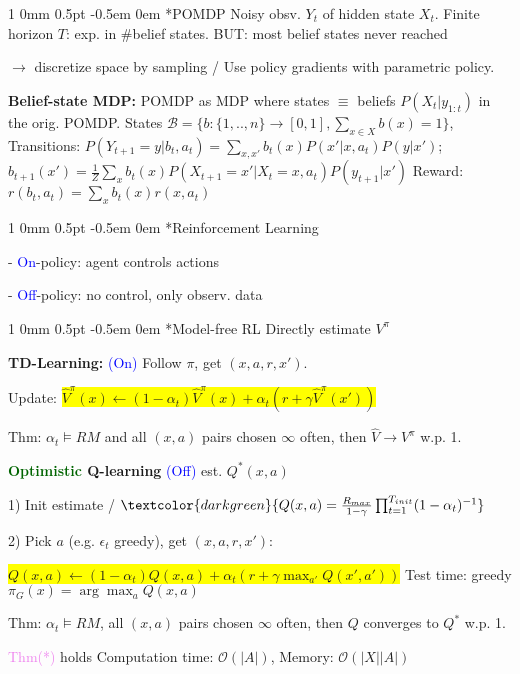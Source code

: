 \documentclass[11pt,landscape,a4paper,fleqn]{article}
\makeatletter
\newcommand*{\rsection}{%
	\@startsection{section}%
	{1}%
	{0mm}%
	{0.5pt}%
	{-0.5em \@plus 0em}
	{\color{myorange}\sffamily\small\bfseries}}
\newcommand{\mhl}[1]{\setlength{\fboxsep}{0pt}\colorbox{yellow}{#1}}
\makeatother
\begin{document}
\begin{multicols*}{4}
		\rsection*{POMDP} Noisy obsv. $Y_t$ of hidden state $X_t$. Finite horizon $T$:
		exp. in \#belief states.
		BUT: most belief states never reached

	$\rightarrow$ discretize space by sampling /
		Use policy gradients with parametric policy.

		\textbf{Belief-state MDP:} POMDP as MDP where states $\equiv$ beliefs $P(X_t | y_{1:t})$ in the orig. POMDP.
		States $\mathcal{B} = \{b : \{1,..,n\} \rightarrow [0,1], \sum_{x \in X} b(x) = 1\}$,
		Transitions: $P(Y_{t+1} = y | b_t, a_t) = \sum_{x,x'} b_t(x) P(x' | x, a_t) P(y | x')$;
	$b_{t+1}(x') = \frac{1}{Z} \sum_x b_t(x) P(X_{t+1} = x' | X_t = x, a_t) P(y_{t+1} | x')$
		Reward: $r(b_t, a_t) = \sum_x b_t(x) r(x, a_t)$

		\rsection*{Reinforcement Learning} %

		- \textcolor{blue}{On}-policy: agent controls actions

		- \textcolor{blue}{Off}-policy: no control, only observ. data


		\rsection*{Model-free RL} Directly estimate $V^\pi$

		\textbf{TD-Learning:} \textcolor{blue}{(On)} Follow $\pi$, get $(x,a,r,x')$.

		Update: \mhl{$\hat{V}^\pi(x) \leftarrow (1 - \alpha_t) \hat{V}^\pi(x) + \alpha_t (r + \gamma \hat{V}^\pi(x'))$}

		Thm: $\alpha_t \vDash RM$ and all $(x,a)$ pairs chosen $\infty$ often, then $\hat{V} \rightarrow V^\pi$ w.p. 1.


		\textbf{\textcolor{darkgreen}{Optimistic} Q-learning} {\fontsize{9}{6}\selectfont \textcolor{blue}{(Off)}} est. $Q^*(x,a)$

		1) Init estimate / $\textcolor{darkgreen}{Q(x,a) = \frac{R_{max}}{1 - \gamma} \prod_{t=1}^{T_{init}} (1 - \alpha_t)^{-1}}$

		2) Pick $a$ (e.g. $\epsilon_t$ greedy), get $(x,a,r,x')$:

		\mhl{$Q(x,a) \leftarrow (1 - \alpha_t) Q(x,a) + \alpha_t (r + \gamma \max_{a'} Q(x', a'))$}
		Test time: greedy $\pi_G(x) = \arg\max_a Q(x,a)$

		Thm: $\alpha_t \vDash RM$, all $(x,a)$ pairs chosen $\infty$ often, then $Q$ converges to $Q^*$ w.p. 1.

		\textcolor{violet}{Thm(*)} holds
		Computation time: $\mathcal{O}(|A|)$, Memory: $\mathcal{O}(|X||A|)$


\end{multicols*}
\end{document}
